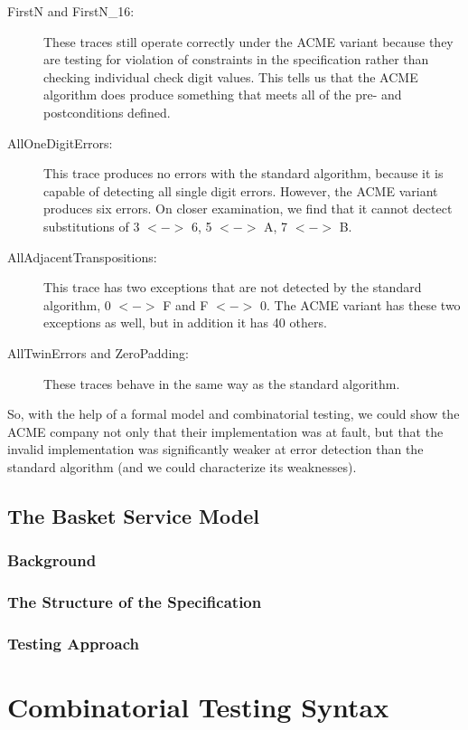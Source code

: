 \documentclass{overturerepchap}
\begin{document}
\begin{description}
  \item[FirstN and FirstN\_16:] These traces still operate correctly under the
  ACME variant because they are testing for violation of constraints in the
  specification rather than checking individual check digit values. This tells
  us that the ACME algorithm does produce something that meets all of the pre-
  and postconditions defined.
  \item[AllOneDigitErrors:] This trace produces no errors with the standard
  algorithm, because it is capable of detecting all single digit errors.
  However, the ACME variant produces six errors. On closer examination, we find
  that it cannot dectect substitutions of 3 $<->$ 6, 5 $<->$ A, 7 $<->$ B.
  \item[AllAdjacentTranspositions:] This trace has two exceptions that are not
  detected by the standard algorithm, 0 $<->$ F and F $<->$ 0. The ACME variant
  has these two exceptions as well, but in addition it has 40 others.
  \item[AllTwinErrors and ZeroPadding:] These traces behave in the same way as
  the standard algorithm.
\end{description}

\noindent So, with the help of a formal model and combinatorial testing, we
could show the ACME company not only that their implementation was at fault, but
that the invalid implementation was significantly weaker at error detection
than the standard algorithm (and we could characterize its weaknesses).


\section{The Basket Service Model}

\subsection{Background}

\subsection{The Structure of the Specification}

\subsection{Testing Approach}


\appendix
\chapter{Combinatorial Testing Syntax}
\label{chap:CTsyntax}
\end{document}
